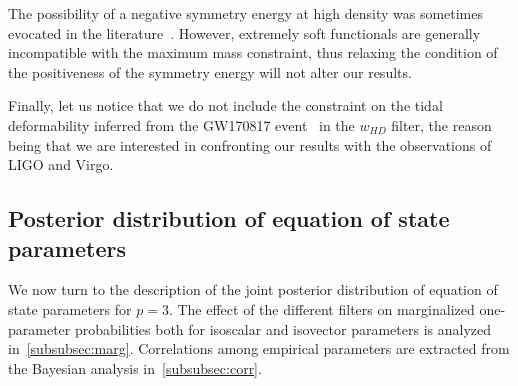 
The possibility of a negative symmetry energy at high density was sometimes 
evocated in the literature~\cite{Li2017,Wiringa1988}. 
However, extremely soft functionals are generally incompatible with the maximum 
mass constraint, thus relaxing the condition of the positiveness of the 
symmetry energy will not alter our results.

Finally, let us notice that we do not include the constraint on the tidal
deformability inferred from the GW170817 event~\cite{GWtidal} in the $w_{HD}$ 
filter, the reason being that we are interested in confronting our results with 
the observations of LIGO and Virgo.

\subsection{Posterior distribution of equation of state 
parameters}\label{subsec:posterior}

We now turn to the description of the joint posterior distribution of equation 
of state parameters for $p=3$. The effect of the different filters on 
marginalized one-parameter probabilities both for isoscalar and isovector 
parameters is analyzed in~\ref{subsubsec:marg}. Correlations among empirical 
parameters are extracted from the Bayesian analysis in~\ref{subsubsec:corr}.

